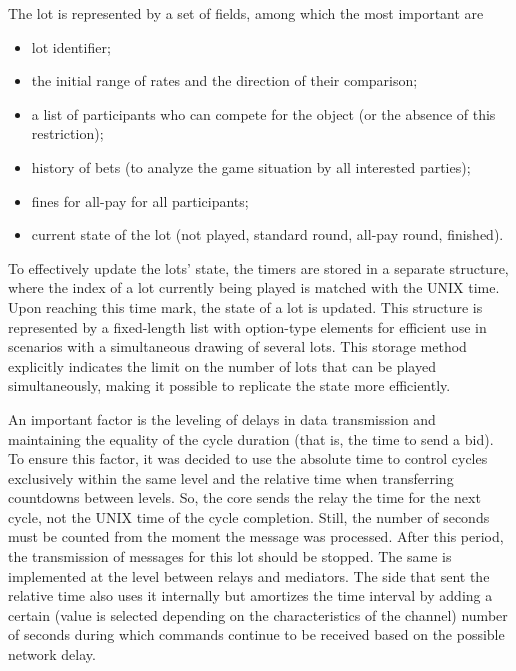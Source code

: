 \documentclass[
]{ceurart}
\begin{document}
The lot is represented by a set of fields, among which the most important are
\begin{itemize}
\item  lot identifier;
\item  the initial range of rates and the direction of their comparison;
\item  a list of participants who can compete for the object (or the absence of this restriction);
\item  history of bets (to analyze the game situation by all interested parties);
\item  fines for all-pay for all participants;
\item  current state of the lot (not played, standard round, all-pay round, finished).
\end{itemize}

To effectively update the lots' state, the timers are stored in a separate structure, where the index of a lot currently being played is matched with the UNIX time. Upon reaching this time mark, the state of a lot is updated. This structure is represented by a fixed-length list with option-type elements for efficient use in scenarios with a simultaneous drawing of several lots. This storage method explicitly indicates the limit on the number of lots that can be played simultaneously, making it possible to replicate the state more efficiently.

An important factor is the leveling of delays in data transmission and maintaining the equality of the cycle duration (that is, the time to send a bid). To ensure this factor, it was decided to use the absolute time to control cycles exclusively within the same level and the relative time when transferring countdowns between levels. So, the core sends the relay the time for the next cycle, not the UNIX time of the cycle completion. Still, the number of seconds must be counted from the moment the message was processed. After this period, the transmission of messages for this lot should be stopped. The same is implemented at the level between relays and mediators. The side that sent the relative time also uses it internally but amortizes the time interval by adding a certain (value is selected depending on the characteristics of the channel) number of seconds during which commands continue to be received based on the possible network delay.
\end{document}
